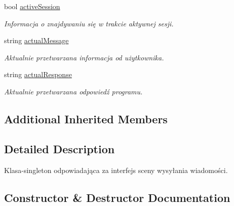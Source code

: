 \begin{DoxyCompactItemize}
\mbox{\label{class_chat_screen_afa4868220665d28ba1f95ed23905d116}} 
bool \mbox{\hyperlink{class_chat_screen_afa4868220665d28ba1f95ed23905d116}{active\+Session}}
\begin{DoxyCompactList}\small\item\em Informacja o znajdywaniu się w trakcie aktywnej sesji. \end{DoxyCompactList}\item 
\mbox{\label{class_chat_screen_aa379a3d9e624b433638d534149c01946}} 
string \mbox{\hyperlink{class_chat_screen_aa379a3d9e624b433638d534149c01946}{actual\+Message}}
\begin{DoxyCompactList}\small\item\em Aktualnie przetwarzana informacja od użytkownika. \end{DoxyCompactList}\item 
\mbox{\label{class_chat_screen_a112b32993f3c10168be768dc7a502af5}} 
string \mbox{\hyperlink{class_chat_screen_a112b32993f3c10168be768dc7a502af5}{actual\+Response}}
\begin{DoxyCompactList}\small\item\em Aktualnie przetwarzana odpowiedź programu. \end{DoxyCompactList}\end{DoxyCompactItemize}
\subsection*{Additional Inherited Members}


\subsection{Detailed Description}
Klasa-\/singleton odpowiadająca za interfejs sceny wysyłania wiadomości. 

\subsection{Constructor \& Destructor Documentation}
\mbox{\label{class_chat_screen_a015393e184776b00fcdcefcd487a8378}} 
